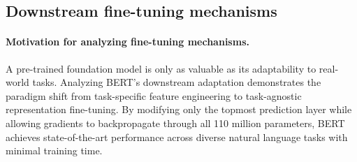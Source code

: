 \documentclass[../../main.tex]{subfiles}
\begin{document}
\subsection{Downstream fine-tuning mechanisms}
\label{subsec:bert_downstream_finetuning}

\paragraph{Motivation for analyzing fine-tuning mechanisms.}
A pre-trained foundation model is only as valuable as its adaptability to real-world tasks. Analyzing BERT's downstream adaptation demonstrates the paradigm shift from task-specific feature engineering to task-agnostic representation fine-tuning. By modifying only the topmost prediction layer while allowing gradients to backpropagate through all 110 million parameters, BERT achieves state-of-the-art performance across diverse natural language tasks with minimal training time.
\end{document}
